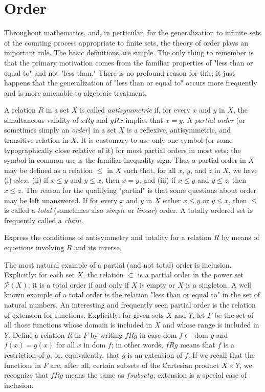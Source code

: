 
\chapter{Order}

Throughout mathematics, and, in perticular, for the generalization to infinite sets of the counting process appropriate to finite sets, the theory of order plays an important role. The basic definitions are simple. The only thing to remember is that the primary motivation comes from the familiar properties of "less than or equal to" and not "less than." There is no profound reason for this; it just happens that the generalization of "less than or equal to" occurs more frequently and is more amenable to algebraic treatment. 

A relation $R$ in a set $X$ is called \textit{antisymmetric} if, for every $x$ and $y$ in $X$, the simultaneous validity of $xRy$ and $yRx$ implies that $x = y$. A \textit{partial order} (or sometimes simply an \textit{order}) in a set $X$ is a reflexive, antisymmetric, and transitive relation in $X$. It is customary to use only one symbol (or some typographically close relative of it) for most partial orders in most sets; the symbol in common use is the familiar inequality sign. Thus a partial order in $X$ may be defined as a relation $\le$ in $X$ such that, for all $x$, $y$, and $z$ in $X$, we have (i) $x le x$, (ii) if $x \le y$ and $y \le x$, then $x = y$, and (iii) if $x \le y$ and $y \le z$, then $x \le z$. The reason for the qualifying "partial" is that some questions about order may be left unanswered. If for every $x$ and $y$ in $X$ either $x \le y$ or $y \le x$, then $\le$ is called a \textit{total} (sometimes also \textit{simple} or \textit{linear}) order. A totally ordered set is frequently called a \textit{chain}. 

\begin{named}[Exercise. ] Express the conditions of antisymmetry and totality for a relation $R$ by means of equetions involving $R$ and its inverse. 
\end{named}

The most natural example of a partial (and not total) order is inclusion. Explicitly: for each set $X$, the relation $\subset$ is a partial order in the power set $\mathcal{P}(X)$; it is a total order if and only if $X$ is empty or $X$ is a singleton. A well known example of a total order is the relation "less than or equal to" in the set of natural numbers. An interesting and frequently seen partial order is the relation of extension for functions. Explicitly: for given sets $X$ and $Y$, let $F$ be the set of all those functions whose domain is included in $X$ and whose range is included in $Y$. Define a relation $R$ in $F$ by writing $fRg$ in case dom $f \subset$ dom $g$ and $f(x) = g(x)$ for all $x$ in dom $f$; in other words, $fRg$ means that $f$ is a restriction of $g$, or, equivalently, that $g$ is an extension of $f$. If we recall that the functions in $F$ are, after all, certain subsets of the Cartesian product $X \times Y$, we recognize that $fRg$ means the same as $f subset g$; extension is a special case of inclusion.

